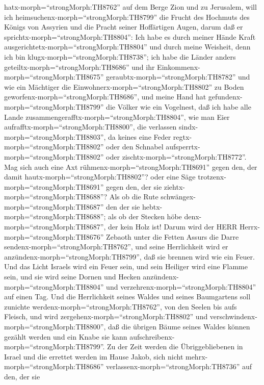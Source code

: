 hatx-morph=``strongMorph:TH8762'' auf dem Berge Zion und zu Jerusalem,
will ich heimsuchenx-morph=``strongMorph:TH8799'' die Frucht des
Hochmuts des Königs von Assyrien und die Pracht seiner Hoffärtigen
Augen,  darum daß er sprichtx-morph=``strongMorph:TH8804'':
Ich habe es durch meiner Hände Kraft
ausgerichtetx-morph=``strongMorph:TH8804'' und durch meine Weisheit,
denn ich bin klugx-morph=``strongMorph:TH8738''; ich habe die Länder
anders geteiltx-morph=``strongMorph:TH8686'' und ihr
Einkommenx-morph=``strongMorph:TH8675''
geraubtx-morph=``strongMorph:TH8782'' und wie ein Mächtiger die
Einwohnerx-morph=``strongMorph:TH8802'' zu Boden
geworfenx-morph=``strongMorph:TH8686'',  und meine Hand hat
gefundenx-morph=``strongMorph:TH8799'' die Völker wie ein Vogelnest, daß
ich habe alle Lande zusammengerafftx-morph=``strongMorph:TH8804'', wie
man Eier aufrafftx-morph=``strongMorph:TH8800'', die verlassen
sindx-morph=``strongMorph:TH8803'', da keines eine Feder
regtx-morph=``strongMorph:TH8802'' oder den Schnabel
aufsperrtx-morph=``strongMorph:TH8802'' oder
zischtx-morph=``strongMorph:TH8772''.  Mag sich auch eine
Axt rühmenx-morph=``strongMorph:TH8691'' gegen den, der damit
hautx-morph=``strongMorph:TH8802''? oder eine Säge
trotzenx-morph=``strongMorph:TH8691'' gegen den, der sie
ziehtx-morph=``strongMorph:TH8688''? Als ob die Rute
schwängex-morph=``strongMorph:TH8687'' den der sie
hebtx-morph=``strongMorph:TH8688''; als ob der Stecken höbe
denx-morph=``strongMorph:TH8687'', der kein Holz ist! 
Darum wird der HERR Herrx-morph=``strongMorph:TH8676'' Zebaoth unter die
Fetten Assurs die Darre sendenx-morph=``strongMorph:TH8762'', und seine
Herrlichkeit wird er anzündenx-morph=``strongMorph:TH8799'', daß sie
brennen wird wie ein Feuer.  Und das Licht Israels wird ein
Feuer sein, und sein Heiliger wird eine Flamme sein, und sie wird seine
Dornen und Hecken anzündenx-morph=``strongMorph:TH8804'' und
verzehrenx-morph=``strongMorph:TH8804'' auf einen Tag.  Und
die Herrlichkeit seines Waldes und seines Baumgartens soll zunichte
werdenx-morph=``strongMorph:TH8762'', von den Seelen bis aufs Fleisch,
und wird zergehenx-morph=``strongMorph:TH8802'' und
verschwindenx-morph=``strongMorph:TH8800'',  daß die
übrigen Bäume seines Waldes können gezählt werden und ein Knabe sie kann
aufschreibenx-morph=``strongMorph:TH8799''.  Zu der Zeit
werden die Übriggebliebenen in Israel und die errettet werden im Hause
Jakob, sich nicht mehrx-morph=``strongMorph:TH8686''
verlassenx-morph=``strongMorph:TH8736'' auf den, der sie
